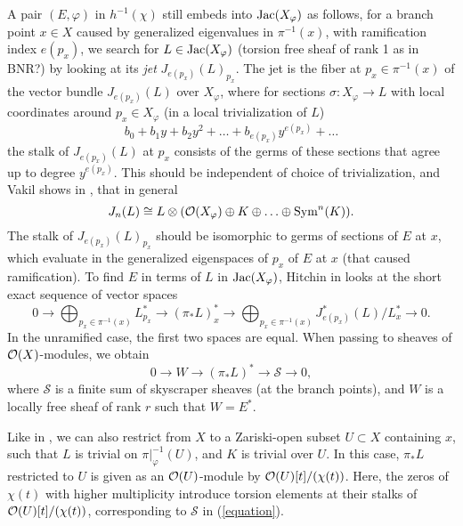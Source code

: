 A pair $(E,\varphi)$ in $h^{-1}(\chi)$ still embeds into $\text{Jac}(X_\varphi)$ as follows, for a branch point $x\in X$ caused by generalized eigenvalues in $\pi^{-1}(x)$, with ramification index $e(p_x)$, we search for $L\in\text{Jac}(X_\varphi)$ (torsion free sheaf of rank 1 as in BNR?) by looking at its \textit{jet} $J_{e(p_x)}(L)_{p_x}$. The jet is the fiber at $p_x\in\pi^{-1}(x)$ of the vector bundle $J_{e(p_x)}(L)$ over $X_\varphi$, where for sections $\sigma:X_\varphi\rightarrow L$ with local coordinates around $p_x\in X_\varphi$ (in a local trivialization of $L$)
\begin{equation}
    b_0+b_1y+b_2y^2+\ldots+b_{e(p_x)}y^{e(p_x)}+\ldots
\end{equation}
the stalk of $J_{e(p_x)}(L)$ at $p_x$ consists of the germs of these sections that agree up to degree $y^{e(p_x)}$. This should be independent of choice of trivialization, and Vakil shows in
\cite{vakil}, that in general
\begin{equation}
    J_n(L)\cong L\otimes (\mathcal{O}(X_\varphi)\oplus K\oplus\ldots\oplus\text{Sym}^n(K)).
\end{equation}
The stalk of $J_{e(p_x)}(L)_{p_x}$ should be isomorphic to germs of sections of $E$ at $x$, which evaluate in the generalized eigenspaces of $p_x$ of $E$ at $x$ (that caused ramification). To find $E$ in terms of $L$ in $\text{Jac}(X_\varphi)$, Hitchin in \cite{hitch} looks at the short exact sequence of vector spaces
\begin{equation}
    0\rightarrow \bigoplus_{p_x\in\pi^{-1}(x)}L_{p_x}^*\rightarrow(\pi_*L)^*_x\rightarrow\bigoplus_{p_x\in\pi^{-1}(x)}J^*_{e(p_x)}(L)/L_x^*\rightarrow0.
\end{equation}
In the unramified case, the first two spaces are equal. When passing to sheaves of $\mathcal{O}(X)$-modules, we obtain
\begin{equation}\label{equation}
    0\rightarrow W\rightarrow(\pi_*L)^*\rightarrow\mathcal{S}\rightarrow0,
\end{equation}
where $\mathcal{S}$ is a finite sum of skyscraper sheaves (at the branch points), and $W$ is a locally free sheaf of rank $r$ such that $W=E^*$.

Like in \cite[Proposition 2.2]{logmar}, we can also restrict from $X$ to a Zariski-open subset $U\subset X$ containing $x$, such that $L$ is trivial on $\pi|_{\varphi}^{-1}(U)$, and $K$ is trivial over $U$. In this case, $\pi_*L$ restricted to $U$ is given as an $\mathcal{O}(U)$-module by $\mathcal{O}(U)[t]/(\chi(t))$. Here, the zeros of $\chi(t)$ with higher multiplicity introduce torsion elements at their stalks of $\mathcal{O}(U)[t]/(\chi(t))$, corresponding to $\mathcal{S}$ in (\ref{equation}).

